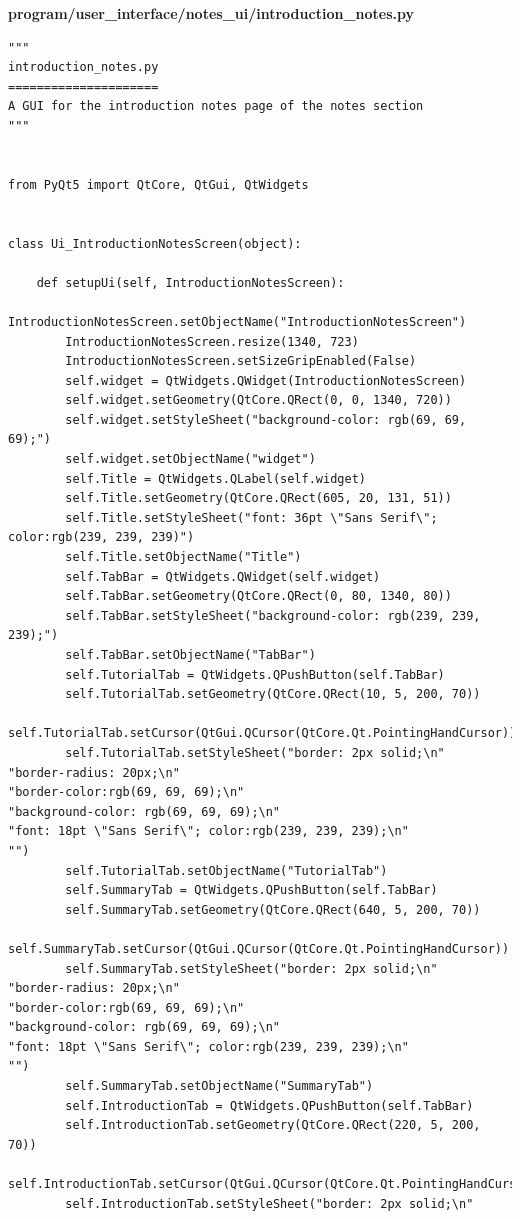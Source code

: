 \documentclass[12pt]{article}
\begin{document}
\textbf{program/user\_interface/notes\_ui/introduction\_notes.py}
\begin{lstlisting}
"""
introduction_notes.py
=====================
A GUI for the introduction notes page of the notes section
"""


from PyQt5 import QtCore, QtGui, QtWidgets


class Ui_IntroductionNotesScreen(object):

    def setupUi(self, IntroductionNotesScreen):
        IntroductionNotesScreen.setObjectName("IntroductionNotesScreen")
        IntroductionNotesScreen.resize(1340, 723)
        IntroductionNotesScreen.setSizeGripEnabled(False)
        self.widget = QtWidgets.QWidget(IntroductionNotesScreen)
        self.widget.setGeometry(QtCore.QRect(0, 0, 1340, 720))
        self.widget.setStyleSheet("background-color: rgb(69, 69, 69);")
        self.widget.setObjectName("widget")
        self.Title = QtWidgets.QLabel(self.widget)
        self.Title.setGeometry(QtCore.QRect(605, 20, 131, 51))
        self.Title.setStyleSheet("font: 36pt \"Sans Serif\"; color:rgb(239, 239, 239)")
        self.Title.setObjectName("Title")
        self.TabBar = QtWidgets.QWidget(self.widget)
        self.TabBar.setGeometry(QtCore.QRect(0, 80, 1340, 80))
        self.TabBar.setStyleSheet("background-color: rgb(239, 239, 239);")
        self.TabBar.setObjectName("TabBar")
        self.TutorialTab = QtWidgets.QPushButton(self.TabBar)
        self.TutorialTab.setGeometry(QtCore.QRect(10, 5, 200, 70))
        self.TutorialTab.setCursor(QtGui.QCursor(QtCore.Qt.PointingHandCursor))
        self.TutorialTab.setStyleSheet("border: 2px solid;\n"
"border-radius: 20px;\n"
"border-color:rgb(69, 69, 69);\n"
"background-color: rgb(69, 69, 69);\n"
"font: 18pt \"Sans Serif\"; color:rgb(239, 239, 239);\n"
"")
        self.TutorialTab.setObjectName("TutorialTab")
        self.SummaryTab = QtWidgets.QPushButton(self.TabBar)
        self.SummaryTab.setGeometry(QtCore.QRect(640, 5, 200, 70))
        self.SummaryTab.setCursor(QtGui.QCursor(QtCore.Qt.PointingHandCursor))
        self.SummaryTab.setStyleSheet("border: 2px solid;\n"
"border-radius: 20px;\n"
"border-color:rgb(69, 69, 69);\n"
"background-color: rgb(69, 69, 69);\n"
"font: 18pt \"Sans Serif\"; color:rgb(239, 239, 239);\n"
"")
        self.SummaryTab.setObjectName("SummaryTab")
        self.IntroductionTab = QtWidgets.QPushButton(self.TabBar)
        self.IntroductionTab.setGeometry(QtCore.QRect(220, 5, 200, 70))
        self.IntroductionTab.setCursor(QtGui.QCursor(QtCore.Qt.PointingHandCursor))
        self.IntroductionTab.setStyleSheet("border: 2px solid;\n"

\end{lstlisting}
\end{document}
